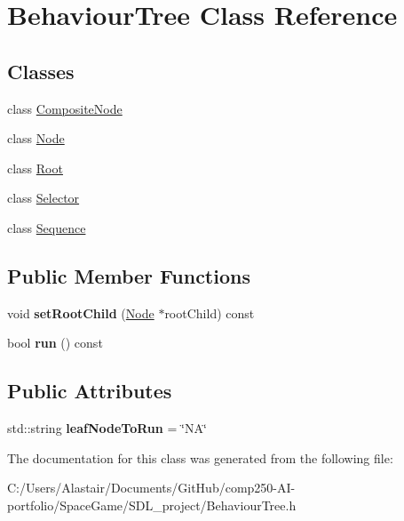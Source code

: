 \hypertarget{class_behaviour_tree}{}\section{Behaviour\+Tree Class Reference}
\label{class_behaviour_tree}
\subsection*{Classes}
\begin{DoxyCompactItemize}
\item 
class \hyperlink{class_behaviour_tree_1_1_composite_node}{Composite\+Node}
\item 
class \hyperlink{class_behaviour_tree_1_1_node}{Node}
\item 
class \hyperlink{class_behaviour_tree_1_1_root}{Root}
\item 
class \hyperlink{class_behaviour_tree_1_1_selector}{Selector}
\item 
class \hyperlink{class_behaviour_tree_1_1_sequence}{Sequence}
\end{DoxyCompactItemize}
\subsection*{Public Member Functions}
\begin{DoxyCompactItemize}
\item 
\mbox{\label{class_behaviour_tree_a0cc081b0682612c13405f6ce5ed0f8a1}} 
void {\bfseries set\+Root\+Child} (\hyperlink{class_behaviour_tree_1_1_node}{Node} $\ast$root\+Child) const
\item 
\mbox{\label{class_behaviour_tree_accac405f3dcd9c4138285abcc0ad4316}} 
bool {\bfseries run} () const
\end{DoxyCompactItemize}
\subsection*{Public Attributes}
\begin{DoxyCompactItemize}
\item 
\mbox{\label{class_behaviour_tree_a604c07c4745e49dc974d766b0898f9ad}} 
std\+::string {\bfseries leaf\+Node\+To\+Run} = \char`\"{}NA\char`\"{}
\end{DoxyCompactItemize}


The documentation for this class was generated from the following file\+:\begin{DoxyCompactItemize}
\item 
C\+:/\+Users/\+Alastair/\+Documents/\+Git\+Hub/comp250-\/\+A\+I-\/portfolio/\+Space\+Game/\+S\+D\+L\+\_\+project/Behaviour\+Tree.\+h\end{DoxyCompactItemize}
